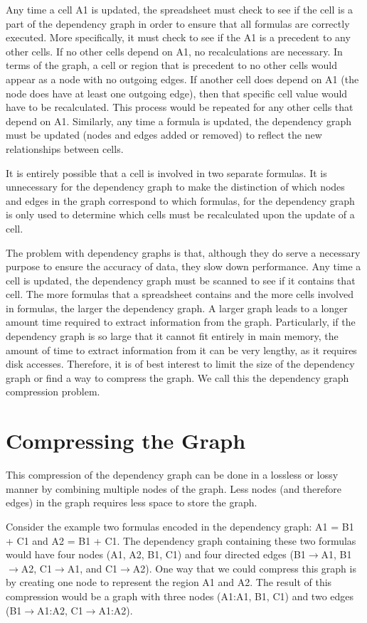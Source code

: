 \documentclass[11pt]{article}
\begin{document}
Any time a cell A1 is updated, the spreadsheet must check to see if the cell is a part of the dependency graph in order to ensure that all formulas are correctly executed. More specifically, it must check to see if the A1 is a precedent to any other cells. If no other cells depend on A1, no recalculations are necessary. In terms of the graph, a cell or region that is precedent to no other cells would appear as a node with no outgoing edges. If another cell does depend on A1 (the node does have at least one outgoing edge), then that specific cell value would have to be recalculated. This process would be repeated for any other cells that depend on A1. Similarly, any time a formula is updated, the dependency graph must be updated (nodes and edges added or removed) to reflect the new relationships between cells.

It is entirely possible that a cell is involved in two separate formulas. It is unnecessary for the dependency graph to make the distinction of which nodes and edges in the graph correspond to which formulas, for the dependency graph is only used to determine which cells must be recalculated upon the update of a cell.

The problem with dependency graphs is that, although they do serve a necessary purpose to ensure the accuracy of data, they slow down performance. Any time a cell is updated, the dependency graph must be scanned to see if it contains that cell. The more formulas that a spreadsheet contains and the more cells involved in formulas, the larger the dependency graph. A larger graph leads to a longer amount time required to extract information from the graph. Particularly, if the dependency graph is so large that it cannot fit entirely in main memory, the amount of time to extract information from it can be very lengthy, as it requires disk accesses. Therefore, it is of best interest to limit the size of the dependency graph or find a way to compress the graph. We call this the dependency graph compression problem.

\section{Compressing the Graph}

This compression of the dependency graph can be done in a lossless or lossy manner by combining multiple nodes of the graph. Less nodes (and therefore edges) in the graph requires less space to store the graph.

Consider the example two formulas encoded in the dependency graph: A1 = B1 + C1 and A2 = B1 + C1. The dependency graph containing these two formulas would have four nodes (A1, A2, B1, C1) and four directed edges (B1$\rightarrow$A1, B1$\rightarrow$A2, C1$\rightarrow$A1, and C1$\rightarrow$A2). One way that we could compress this graph is by creating one node to represent the region A1 and A2. The result of this compression would be a graph with three nodes (A1:A1, B1, C1) and two edges (B1$\rightarrow$A1:A2, C1$\rightarrow$A1:A2).
\end{document}
